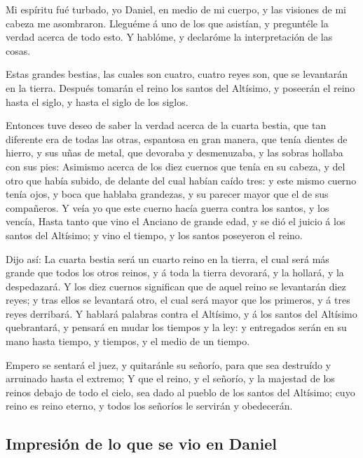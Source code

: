  Mi espíritu fué turbado, yo Daniel, en medio de mi cuerpo,
y las visiones de mi cabeza me asombraron.  Lleguéme á uno
de los que asistían, y preguntéle la verdad acerca de todo esto. Y
hablóme, y declaróme la interpretación de las cosas.

 Estas grandes bestias, las cuales son cuatro, cuatro reyes
son, que se levantarán en la tierra.  Después tomarán el
reino los santos del Altísimo, y poseerán el reino hasta el siglo, y
hasta el siglo de los siglos.

 Entonces tuve deseo de saber la verdad acerca de la cuarta
bestia, que tan diferente era de todas las otras, espantosa en gran
manera, que tenía dientes de hierro, y sus uñas de metal, que devoraba y
desmenuzaba, y las sobras hollaba con sus pies:  Asimismo
acerca de los diez cuernos que tenía en su cabeza, y del otro que había
subido, de delante del cual habían caído tres: y este mismo cuerno tenía
ojos, y boca que hablaba grandezas, y su parecer mayor que el de sus
compañeros.  Y veía yo que este cuerno hacía guerra contra
los santos, y los vencía,  Hasta tanto que vino el Anciano
de grande edad, y se dió el juicio á los santos del Altísimo; y vino el
tiempo, y los santos poseyeron el reino.

 Dijo así: La cuarta bestia será un cuarto reino en la
tierra, el cual será más grande que todos los otros reinos, y á toda la
tierra devorará, y la hollará, y la despedazará.  Y los
diez cuernos significan que de aquel reino se levantarán diez reyes; y
tras ellos se levantará otro, el cual será mayor que los primeros, y á
tres reyes derribará.  Y hablará palabras contra el
Altísimo, y á los santos del Altísimo quebrantará, y pensará en mudar
los tiempos y la ley: y entregados serán en su mano hasta tiempo, y
tiempos, y el medio de un tiempo.

 Empero se sentará el juez, y quitaránle su señorío, para
que sea destruído y arruinado hasta el extremo;  Y que el
reino, y el señorío, y la majestad de los reinos debajo de todo el
cielo, sea dado al pueblo de los santos del Altísimo; cuyo reino es
reino eterno, y todos los señoríos le servirán y obedecerán.

\hypertarget{impresiuxf3n-de-lo-que-se-vio-en-daniel}{%
\subsection{Impresión de lo que se vio en
Daniel}\label{impresiuxf3n-de-lo-que-se-vio-en-daniel}}

